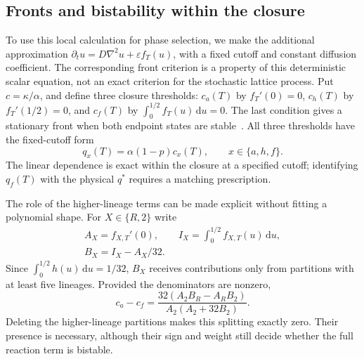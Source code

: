 \documentclass[pre,twocolumn,superscriptaddress,showpacs,floatfix]{revtex4-2}
\newcommand{\qs}{q^{*}}
\newcommand{\ds}{\mathrm{d}}
\begin{document}
\subsection{Fronts and bistability within the closure}

To use this local calculation for phase selection, we make the additional
approximation
$\partial_tu=D\nabla^2u+\varepsilon f_T(u)$, with a fixed cutoff and constant
diffusion coefficient. The corresponding front criterion is a property of this
deterministic scalar equation, not an exact criterion for the stochastic lattice
process. Put $c=\kappa/\alpha$, and define three closure thresholds:
$c_a(T)$ by $f_T'(0)=0$, $c_h(T)$ by $f_T'(1/2)=0$, and $c_f(T)$ by
$\int_0^{1/2}f_T(u)\,\ds u=0$. The last condition gives a stationary front when
both endpoint states are stable~\cite{durrett1994b,durrett2009}. All three
thresholds have the fixed-cutoff form
\begin{equation}
 q_x(T)=\alpha(1-p)c_x(T),\qquad x\in\{a,h,f\}.
 \label{eq:line}
\end{equation}
The linear dependence is exact within the closure at a specified cutoff;
identifying $q_f(T)$ with the physical $\qs$ requires a matching prescription.

The role of the higher-lineage terms can be made explicit without fitting a
polynomial shape. For $X\in\{R,2\}$ write
\[
 \begin{gathered}
 A_X=f_{X,T}'(0),\qquad
 I_X=\int_0^{1/2}f_{X,T}(u)\,\ds u,\\
 B_X=I_X-A_X/32.
 \end{gathered}
\]
Since $\int_0^{1/2}h(u)\,\ds u=1/32$, $B_X$ receives contributions only from
partitions with at least five lineages. Provided the denominators are nonzero,
\begin{equation}
 c_a-c_f=
 \frac{32(A_2B_R-A_RB_2)}{A_2(A_2+32B_2)}.
 \label{eq:lineagesplitting}
\end{equation}
Deleting the higher-lineage partitions makes this splitting exactly zero.
Their presence is necessary, although their sign and weight still decide whether
the full reaction term is bistable.
\end{document}
